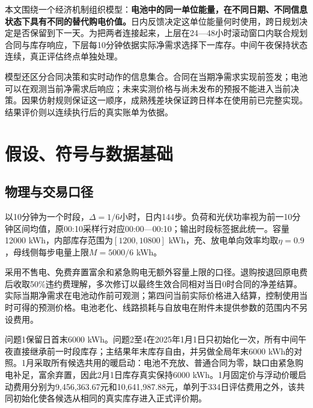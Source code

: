 \documentclass[UTF8,a4paper,zihao=-4,fontset=mac]{ctexart}
\begin{document}
本文围绕一个经济机制组织模型：\textbf{电池中的同一单位能量，在不同日期、不同信息状态下具有不同的替代购电价值。}日内反馈决定这单位能量何时使用，跨日规划决定是否保留到下一天。为把两者连接起来，上层在24—48小时滚动窗口内联合规划合同与库存响应，下层每10分钟依据实际净需求选择下一库存。中间午夜保持状态连续，真正评估终点单独处理。

模型还区分合同决策和实时动作的信息集合。合同在当期净需求实现前签发；电池可以在观测当前净需求后响应；未来实测价格与尚未发布的预报不能进入当前决策。因果仿射规则保证这一顺序，成熟残差块保证跨日样本在使用前已完整实现。结果评价则以连续执行后的真实账单为依据。

\section{假设、符号与数据基础}
\subsection{物理与交易口径}
以10分钟为一个时段，$\Delta=1/6$小时，日内144步。负荷和光伏功率视为前一10分钟区间均值，原00:10采样行对应00:00—00:10；输出时段标签据此统一。容量12000 kWh，内部库存范围为$[1200,10800]$ kWh，充、放电单向效率均取$\eta=0.9$，母线侧每步电量上限$M=5000/6$ kWh。

采用不售电、免费弃置富余和紧急购电无额外容量上限的口径。退购按退回原电费后收取50\%违约费理解，多次修订以最终生效合同相对当日0时合同的净差结算。实际当期净需求在电池动作前可观测；第四问当前实际价格进入结算，控制使用当时可得的预测价格。电池老化、线路损耗与自放电在附件未提供参数的范围内不另设费用。

问题1保留日首末6000 kWh。问题2至4在2025年1月1日只初始化一次，所有中间午夜直接继承前一时段库存；主结果年末库存自由，并另做全局年末6000 kWh的对照。1月采取所有候选共用的暖启动：电池不充放、普通合同为零，缺口由紧急购电补足，富余弃置，因此2月1日库存真实保持6000 kWh。1月固定价与浮动价暖启动费用分别为9,456,363.67元和10,641,987.88元，单列于334日评估费用之外，该共同初始化使各候选从相同的真实库存进入正式评价期。
\end{document}
